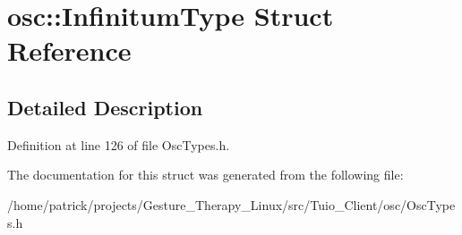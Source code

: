 \hypertarget{structosc_1_1_infinitum_type}{}\section{osc\+:\+:Infinitum\+Type Struct Reference}
\label{structosc_1_1_infinitum_type}


\subsection{Detailed Description}


Definition at line 126 of file Osc\+Types.\+h.



The documentation for this struct was generated from the following file\+:\begin{DoxyCompactItemize}
\item 
/home/patrick/projects/\+Gesture\+\_\+\+Therapy\+\_\+\+Linux/src/\+Tuio\+\_\+\+Client/osc/Osc\+Types.\+h\end{DoxyCompactItemize}
